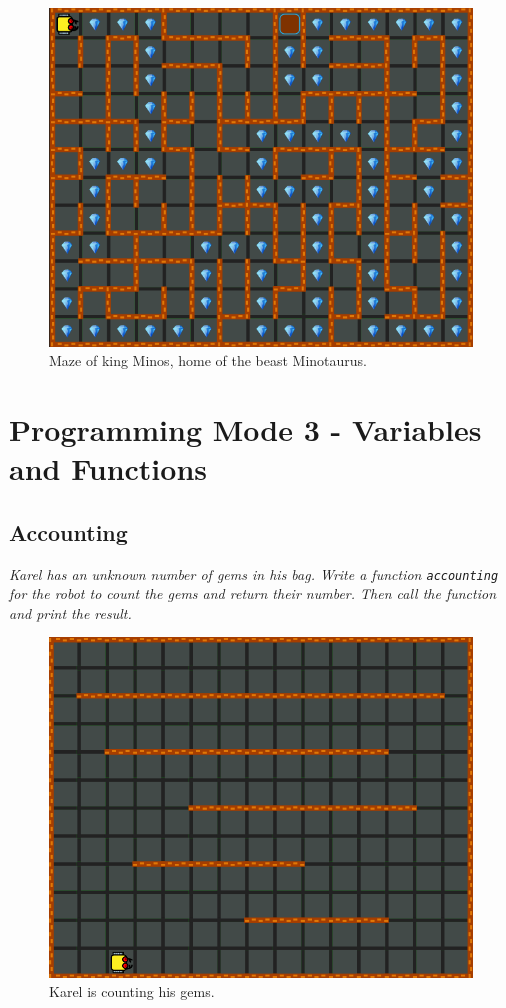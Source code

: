 \begin{figure}[!ht]
\begin{center}
\includegraphics[height=0.4\textwidth]{img/f14.png}
\end{center}
\vspace{-4mm}
\caption{Maze of king Minos, home of the beast Minotaurus.}
\label{fig:f14}
\end{figure}



\section{Programming Mode 3 - Variables and Functions}

\subsection{Accounting}

{\em Karel has an unknown number of gems in his bag. Write a function {\tt accounting} for the 
robot to count the gems and return their number. Then call the function and print the result.}


\begin{figure}[!ht]
\begin{center}
\includegraphics[height=0.4\textwidth]{img/h01.png}
\end{center}
\vspace{-4mm}
\caption{Karel is counting his gems.}
\label{fig:h01}
\end{figure}

